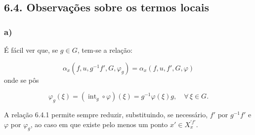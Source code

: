 \subsection*{6.4. Observações sobre os termos locais}
\subsubsection*{a)} É fácil ver que, se $g\in G$, tem-se a relação:

\begin{equation}\tag{6.4.1}
\alpha_x(f,u,g^{-1}f',G,\varphi_g)=\alpha_x(f,u,f',G,\varphi)
\end{equation}
onde se pôs

\begin{equation}\tag{6.4.2}
\varphi_g(\xi)=(\operatorname{int}_g\circ\varphi)(\xi)=g^{-1}\varphi(\xi)g,
\quad \forall\,\xi\in G.
\end{equation}

A relação 6.4.1 permite sempre reduzir, substituindo, se necessário, $f'$ por $g^{-1}f'$ e $\varphi$ por $\varphi_g$, ao caso em que existe pelo menos um ponto $x'\in X_x^{\prime f'}$.
